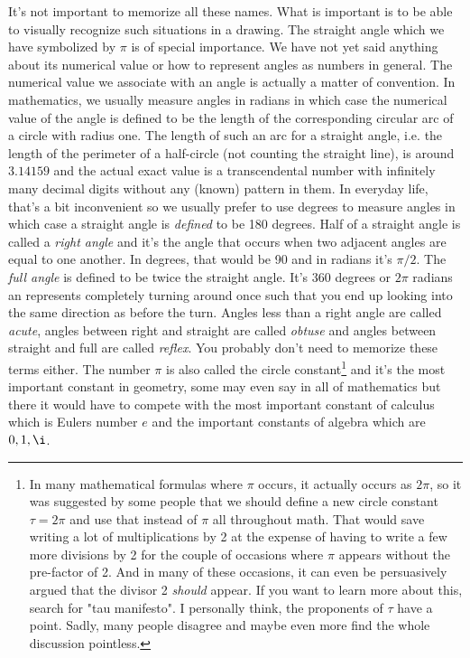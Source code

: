 It's not important to memorize all these names. What is important is to be able to visually recognize such situations in a drawing. The straight angle which we have symbolized by $\pi$ is of special importance. We have not yet said anything about its numerical value or how to represent angles as numbers in general. The numerical value we associate with an angle is actually a matter of convention. In mathematics, we usually measure angles in radians in which case the numerical value of the angle is defined to be the length of the corresponding circular arc of a circle with radius one. The length of such an arc for a straight angle, i.e. the length of the perimeter of a half-circle (not counting the straight line), is around $3.14159$ and the actual exact value is a transcendental number with infinitely many decimal digits without any (known) pattern in them. In everyday life, that's a bit inconvenient so we usually prefer to use degrees to measure angles in which case a straight angle is \emph{defined} to be 180 degrees. Half of a straight angle is called a \emph{right angle} and it's the angle that occurs when two adjacent angles are equal to one another. In degrees, that would be 90 and in radians it's $\pi / 2$. The \emph{full angle} is defined to be twice the straight angle. It's 360 degrees or $2 \pi$ radians an represents completely turning around once such that you end up looking into the same direction as before the turn. Angles less than a right angle are called \emph{acute}, angles between right and straight are called \emph{obtuse} and angles between straight and full are called \emph{reflex}. You probably don't need to memorize these terms either. The number $\pi$ is also called the circle constant\footnote{In many mathematical formulas where $\pi$ occurs, it actually occurs as $2 \pi$, so it was suggested by some people that we should define a new circle constant $\tau = 2 \pi$ and use that instead of $\pi$ all throughout math. That would save writing a lot of multiplications by 2 at the expense of having to write a few more divisions by 2 for the couple of occasions where $\pi$ appears without the pre-factor of 2. And in many of these occasions, it can even be persuasively argued that the divisor 2 \emph{should} appear. If you want to learn more about this, search for "tau manifesto". I personally think, the proponents of $\tau$ have a point. Sadly, many people disagree and maybe even more find the whole discussion pointless.} and it's the most important constant in geometry, some may even say in all of mathematics but there it would have to compete with the most important constant of calculus which is Eulers number $e$ and the important constants of algebra which are $0,1, \i$.

